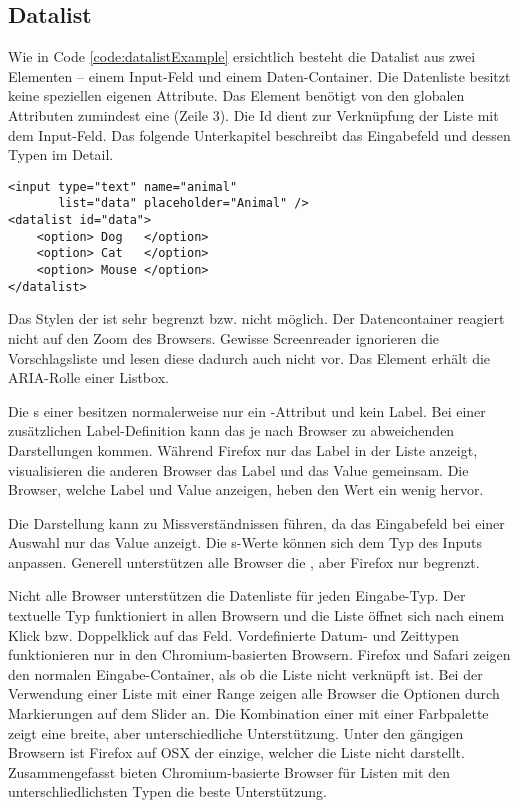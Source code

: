 \subsection{Datalist}
\label{sec:datalist}

Wie in Code \ref{code:datalistExample} ersichtlich besteht die Datalist aus zwei Elementen – einem Input-Feld und einem Daten-Container. 
Die Datenliste besitzt keine speziellen eigenen Attribute. 
Das Element benötigt von den globalen Attributen zumindest eine  (Zeile 3). 
Die Id dient zur Verknüpfung der Liste mit dem Input-Feld. 
Das folgende Unterkapitel \textbf{} beschreibt das Eingabefeld und dessen Typen im Detail. 

\begin{lstlisting}[style = htmlcssjs, caption = Beispiel – Datalist, label = code:datalistExample]
<input type="text" name="animal" 
       list="data" placeholder="Animal" />
<datalist id="data">
    <option> Dog   </option>
    <option> Cat   </option>
    <option> Mouse </option>
</datalist>
\end{lstlisting}

Das Stylen der  ist sehr begrenzt bzw. nicht möglich. 
Der Datencontainer reagiert nicht auf den Zoom des Browsers. 
Gewisse Screenreader ignorieren die Vorschlagsliste und lesen diese dadurch auch nicht vor. 
Das Element erhält die ARIA-Rolle einer Listbox. 

Die s einer  besitzen normalerweise nur ein -Attribut und kein Label. 
Bei einer zusätzlichen Label-Definition kann das je nach Browser zu abweichenden Darstellungen kommen. 
Während Firefox nur das Label in der Liste anzeigt, visualisieren die anderen Browser das Label und das Value gemeinsam. 
Die Browser, welche Label und Value anzeigen, heben den Wert ein wenig hervor. 

Die Darstellung kann zu Missverständnissen führen, da das Eingabefeld bei einer Auswahl nur das Value anzeigt. 
Die s-Werte können sich dem Typ des Inputs anpassen. 
Generell unterstützen alle Browser die , aber Firefox nur begrenzt. 

Nicht alle Browser unterstützen die Datenliste für jeden Eingabe-Typ. 
Der textuelle Typ funktioniert in allen Browsern und die Liste öffnet sich nach einem Klick bzw. Doppelklick auf das Feld. 
Vordefinierte Datum- und Zeittypen funktionieren nur in den Chromium-basierten Browsern. 
Firefox und Safari zeigen den normalen Eingabe-Container, als ob die Liste nicht verknüpft ist. 
Bei der Verwendung einer Liste mit einer Range zeigen alle Browser die Optionen durch Markierungen auf dem Slider an. 
Die Kombination einer  mit einer Farbpalette zeigt eine breite, aber unterschiedliche Unterstützung. 
Unter den gängigen Browsern ist Firefox auf OSX der einzige, welcher die Liste nicht darstellt. 
Zusammengefasst bieten Chromium-basierte Browser für Listen mit den unterschliedlichsten Typen die beste Unterstützung. 


